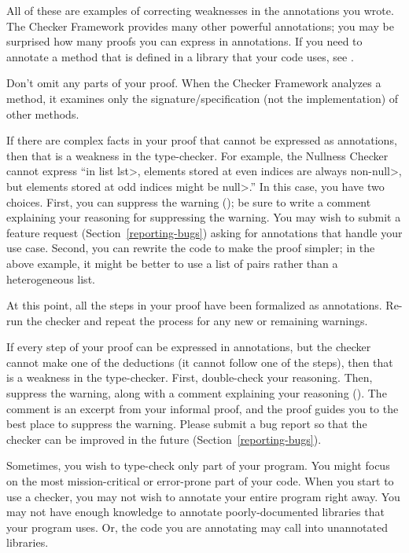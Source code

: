 All of these are examples of correcting weaknesses in the annotations you wrote.
The Checker Framework provides many other powerful annotations; you may
be surprised how many proofs you can express in annotations.
If you need to annotate a method that is defined in a
library that your code uses, see .

Don't omit any parts of your proof.  When the Checker Framework analyzes
a method, it examines only the signature/specification (not the implementation)
of other methods.

If there are complex facts in your proof that cannot be expressed as
annotations, then that is a weakness in the type-checker.  For example,
the Nullness Checker cannot express ``in list \<lst>, elements stored at
even indices are always non-\<null>, but elements stored at odd indices
might be \<null>.''  In this case, you have two choices.
%
First, you can suppress the warning
(); be sure to write a comment
explaining your reasoning for suppressing the warning.  You may wish to
submit a feature request (Section~\ref{reporting-bugs}) asking for
annotations that handle your use case.
%
Second, you can rewrite the code to make the proof simpler;
in the above example, it might be better to use a list of pairs
rather than a heterogeneous list.

At this point, all the steps in your proof have been formalized as
annotations.  Re-run the checker and repeat the process for any new or
remaining warnings.

If every step of your proof can be expressed in annotations, but the
checker cannot make one of the deductions (it cannot follow one of the
steps), then that is a weakness in the type-checker.  First, double-check
your reasoning.  Then, suppress the warning, along with a comment
explaining your reasoning ().
The comment is an excerpt from your informal proof, and the proof guides
you to the best place to suppress the warning.
Please submit a bug report so that the checker can be improved
in the future (Section~\ref{reporting-bugs}).





Sometimes, you wish to type-check only part of your program.
You might focus on the most mission-critical or error-prone part of your
code.  When you start to use a checker, you may not wish to annotate
your entire program right away.
You may not have
enough knowledge to annotate poorly-documented libraries that your program uses.
Or, the code you are annotating may call into unannotated libraries.

